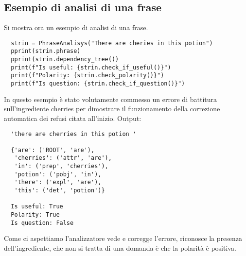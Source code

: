 \subsection{Esempio di analisi di una frase}
Si mostra ora un esempio di analisi di una frase.
\begin{lstlisting}
  strin = PhraseAnalisys("There are cheries in this potion")
  pprint(strin.phrase)
  pprint(strin.dependency_tree())
  print(f"Is useful: {strin.check_if_useful()}")
  print(f"Polarity: {strin.check_polarity()}")
  print(f"Is question: {strin.check_if_question()}")
\end{lstlisting}
In questo esempio è stato volutamente commesso un errore di battitura sull'ingrediente cherries per dimostrare il funzionamento della correzione automatica dei refusi citata all'inizio.
\newline
\newline
Output:
\begin{lstlisting}
  'there are cherries in this potion '

  {'are': ('ROOT', 'are'),
   'cherries': ('attr', 'are'),
   'in': ('prep', 'cherries'),
   'potion': ('pobj', 'in'),
   'there': ('expl', 'are'),
   'this': ('det', 'potion')}

  Is useful: True
  Polarity: True
  Is question: False
\end{lstlisting}

Come ci aspettiamo l'analizzatore vede e corregge l'errore, riconosce la presenza dell'ingrediente, che non si tratta di una domanda è che la polarità è positiva.
